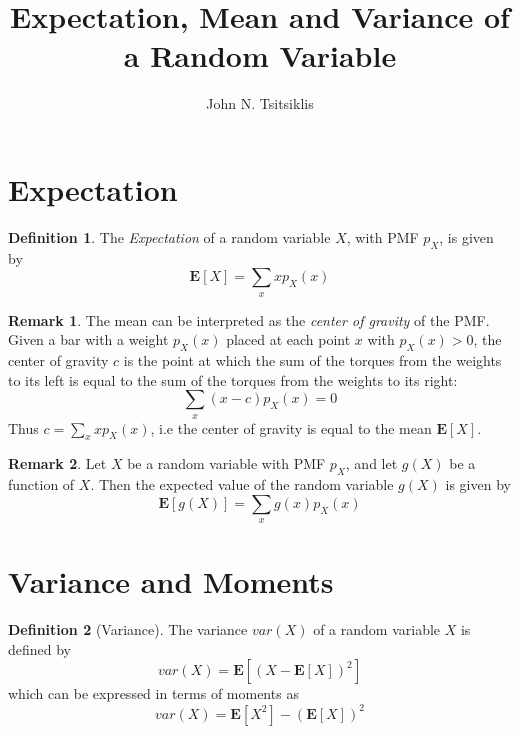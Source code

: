\documentclass{tufte-handout}
\author{John N. Tsitsiklis}
\title{Expectation, Mean and Variance of a Random Variable}
\theoremstyle{definition} \newtheorem{definition}{Definition}
\theoremstyle{definition} \newtheorem{remark}{Remark}
\theoremstyle{definition} \newtheorem{example}{Example}
\newcommand{\pmf}[2]{p_#1 \left( #2 \right)}
\newcommand{\expt}[1]{\mathbf{E} \left[ #1 \right]}
\begin{document}
\maketitle
\section{Expectation}
\begin{definition}
  The \emph{Expectation} of a random variable $X$, with PMF $p_X$, is
  given by
  \begin{equation*}
    \expt{X} = \sum_x x \pmf{X}{x}
  \end{equation*}
\end{definition}

\begin{remark}
  The mean can be interpreted as the \emph{center of gravity} of the PMF.
  Given a bar with a weight $\pmf{X}{x}$ placed at each point $x$ with
  $\pmf{X}{x} > 0$, the center of gravity $c$ is the point at which the
  sum of the torques from the weights to its left is equal to the sum of
  the torques from the weights to its right:
  \begin{equation*}
    \sum_x (x - c) \pmf{X}{x} = 0
  \end{equation*}
  Thus $c = \sum_x x \pmf{X}{x}$, i.e the center of gravity is equal to
  the mean $\expt{X}$.
\end{remark}

\begin{remark}
  Let $X$ be a random variable with PMF $p_X$, and let $g(X)$ be a
  function of $X$. Then the expected value of the random variable $g(X)$
  is given by
  \begin{equation*}
    \expt{g(X)} = \sum_x g(x) \pmf{X}{x}
  \end{equation*}
\end{remark}

\section{Variance and Moments}
\begin{definition}[Variance]
  The variance $var(X)$ of a random variable $X$ is defined by
  \begin{equation*}
    var(X) = \expt{{(X - \expt{X})}^2}
  \end{equation*}
  which can be expressed in terms of moments as
  \begin{equation*}
    var(X) = \expt{X^2} - {\left( \expt{X} \right)}^2
  \end{equation*}
\end{definition}
\end{document}

